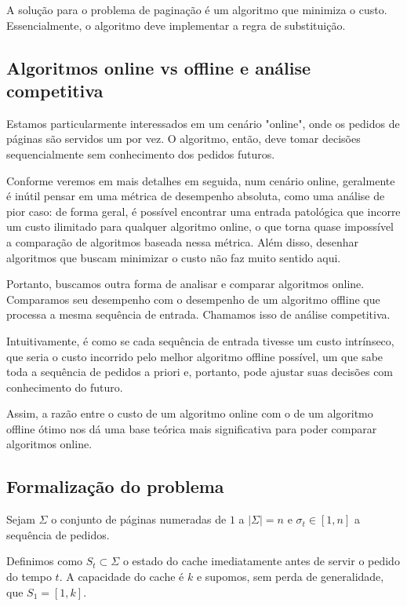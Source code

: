 \documentclass[a4paper,oneside,reqno,12pt]{amsart}
\begin{document}
A solução para o problema de paginação é um algoritmo que minimiza o custo. Essencialmente, o algoritmo deve implementar a regra de substituição.

\subsection{Algoritmos online vs offline e análise competitiva}

Estamos particularmente interessados em um cenário "online", onde os pedidos de páginas são servidos um por vez. O algoritmo, então, deve tomar decisões sequencialmente sem conhecimento dos pedidos futuros. 

Conforme veremos em mais detalhes em seguida, num cenário online, geralmente é inútil pensar em uma métrica de desempenho absoluta, como uma análise de pior caso: de forma geral, é possível encontrar uma entrada patológica que incorre um custo ilimitado para qualquer algoritmo online, o que torna quase impossível a comparação de algoritmos baseada nessa métrica. Além disso, desenhar algoritmos que buscam minimizar o custo não faz muito sentido aqui.

Portanto, buscamos outra forma de analisar e comparar algoritmos online. Comparamos seu desempenho com o desempenho de um algoritmo offline que processa a mesma sequência de entrada. Chamamos isso de análise competitiva.

Intuitivamente, é como se cada sequência de entrada tivesse um custo intrínseco, que seria o custo incorrido pelo melhor algoritmo offline possível, um que sabe toda a sequência de pedidos a priori e, portanto, pode ajustar suas decisões com conhecimento do futuro.

Assim, a razão entre o custo de um algoritmo online com o de um algoritmo offline ótimo nos dá uma base teórica mais significativa para poder comparar algoritmos online.

\subsection{Formalização do problema}

Sejam $\Sigma$ o conjunto de páginas numeradas de $1$ a $|\Sigma|=n$ e $\sigma_t \in [1,n]$ a sequência de pedidos. 

Definimos como $S_t \subset \Sigma$ o estado do cache imediatamente antes de servir o pedido do tempo $t$. A capacidade do cache é $k$ e supomos, sem perda de generalidade, que $S_1 = [1,k]$.
\end{document}

